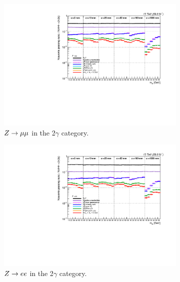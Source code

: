 \begin{figure}[htb!]
	\centering
	\captionsetup[subfigure]{justification=centering}
	\begin{subfigure}[h]{0.49\linewidth}
		\centering
		\includegraphics[width=\linewidth]{figs/05_analysis/2018_signal_2G2Q_Z_MU_efficiency_raw.pdf}
		\caption{$Z\to\mu\mu$ in the 2$\gamma$ category.}
	\end{subfigure}
	\begin{subfigure}[h]{0.49\linewidth}
		\centering
		\includegraphics[width=\linewidth]{figs/05_analysis/2018_signal_2G2Q_Z_ELE_efficiency_raw.pdf}
		\caption{$Z\to ee$ in the 2$\gamma$ category.}
	\end{subfigure}
	\begin{subfigure}[h]{0.49\linewidth}
		\centering

\end{subfigure}
\end{figure}

